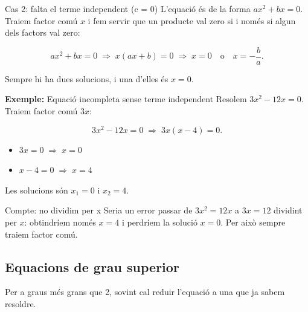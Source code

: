 \begin{definicio}{Cas 2: falta el terme independent (c = 0)}
L'equació és de la forma $ax^2+bx=0$. Traiem factor comú $x$ i fem servir que un producte val zero si i només si algun dels factors val zero:

\[
ax^2+bx=0 \;\Rightarrow\; x(ax+b)=0 \;\Rightarrow\; x=0 \quad \text{o} \quad x=-\frac{b}{a}.
\]

Sempre hi ha dues solucions, i una d'elles és $x=0$.
\end{definicio}

\begin{exemple}{\textbf{Exemple:} Equació incompleta sense terme independent}
Resolem $3x^2-12x=0$. Traiem factor comú $3x$:

\[
3x^2-12x=0 \;\Rightarrow\; 3x(x-4)=0.
\]

\begin{itemize}
\item $3x=0 \;\Rightarrow\; x=0$
\item $x-4=0 \;\Rightarrow\; x=4$
\end{itemize}

Les solucions són $x_1=0$ i $x_2=4$.
\end{exemple}

\begin{nota}{Compte: no dividim per x}
Seria un error passar de $3x^2=12x$ a $3x=12$ dividint per $x$: obtindríem només $x=4$ i perdríem la solució $x=0$. Per això sempre traiem factor comú.
\end{nota}

\subsection{Equacions de grau superior}

Per a graus més grans que 2, sovint cal reduir l'equació a una que ja sabem resoldre.

